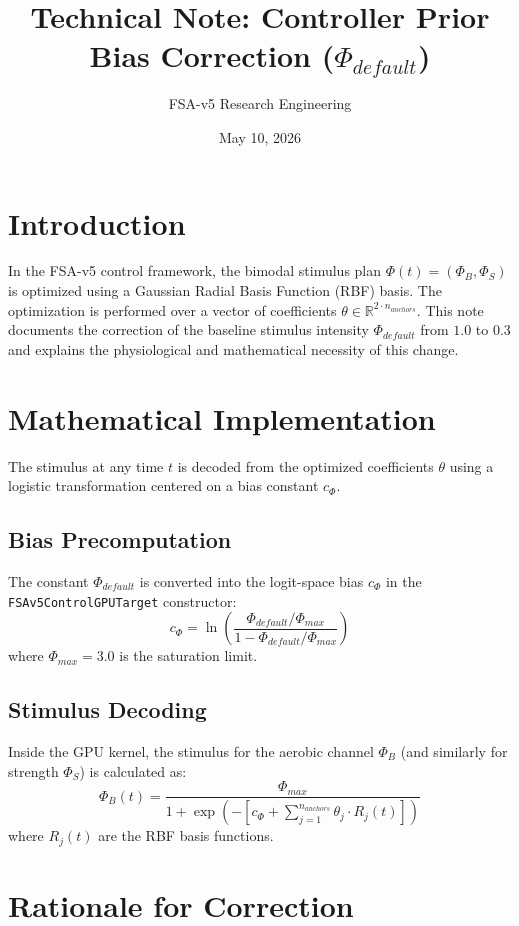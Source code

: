 \documentclass[11pt,a4paper]{article}
\title{Technical Note: Controller Prior Bias Correction ($\Phi_{default}$)}
\author{FSA-v5 Research Engineering}
\date{May 10, 2026}
\begin{document}
\maketitle

\section{Introduction}
In the FSA-v5 control framework, the bimodal stimulus plan $\Phi(t) = (\Phi_B, \Phi_S)$ is optimized using a Gaussian Radial Basis Function (RBF) basis. The optimization is performed over a vector of coefficients $\theta \in \mathbb{R}^{2 \cdot n_{anchors}}$. This note documents the correction of the baseline stimulus intensity $\Phi_{default}$ from $1.0$ to $0.3$ and explains the physiological and mathematical necessity of this change.

\section{Mathematical Implementation}
The stimulus at any time $t$ is decoded from the optimized coefficients $\theta$ using a logistic transformation centered on a bias constant $c_\Phi$. 

\subsection{Bias Precomputation}
The constant $\Phi_{default}$ is converted into the logit-space bias $c_\Phi$ in the \texttt{FSAv5ControlGPUTarget} constructor:
\begin{equation}
    c_\Phi = \ln \left( \frac{\Phi_{default} / \Phi_{max}}{1 - \Phi_{default} / \Phi_{max}} \right)
\end{equation}
where $\Phi_{max} = 3.0$ is the saturation limit.

\subsection{Stimulus Decoding}
Inside the GPU kernel, the stimulus for the aerobic channel $\Phi_B$ (and similarly for strength $\Phi_S$) is calculated as:
\begin{equation}
    \Phi_B(t) = \frac{\Phi_{max}}{1 + \exp\left( -\left[ c_\Phi + \sum_{j=1}^{n_{anchors}} \theta_j \cdot R_j(t) \right] \right)}
\end{equation}
where $R_j(t)$ are the RBF basis functions. 

\section{Rationale for Correction}
\end{document}
